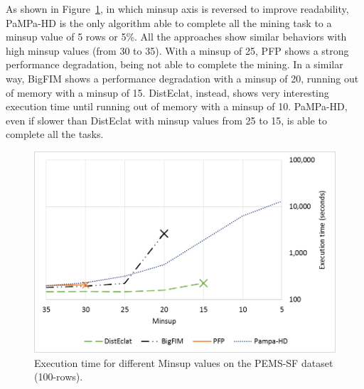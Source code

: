 As shown in Figure~\ref{pems_confronto}, in which minsup axis is reversed to improve readability, PaMPa-HD is the only algorithm able to complete all the mining task to a minsup value of 5 rows or 5\%. All the approaches show similar behaviors with high minsup values (from 30 to 35).
With a minsup of 25, PFP shows a strong performance degradation, being not able to complete the mining.
In a similar way, BigFIM shows a performance degradation with a minsup of 20, running out of memory with a minsup of 15.
DistEclat, instead, shows very interesting execution time until running out of memory with a minsup of 10.
PaMPa-HD, even if slower than DistEclat with minsup values from 25 to 15, is able to complete all the tasks.


\begin{figure}[!t]
\includegraphics[width=5in]{chapters/pampa/immagini_extension/pems_confronto.png}
\caption{Execution time for different Minsup values on the PEMS-SF dataset (100-rows).}
\label{pems_confronto}
\end{figure}

